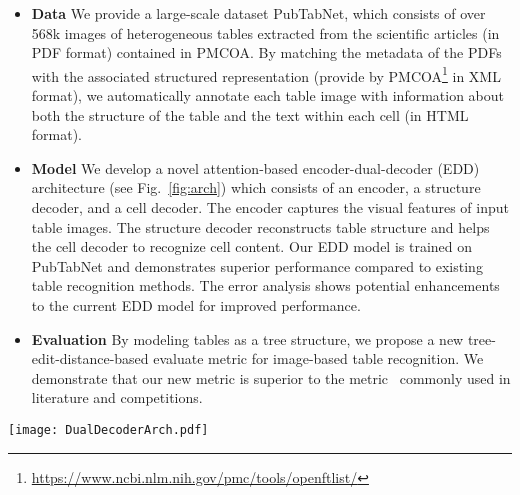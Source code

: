 \documentclass[conference]{IEEEtran}
\begin{document}
\begin{itemize}[noitemsep,leftmargin=*]
  \item \textbf{Data} We provide a large-scale dataset PubTabNet, which
  consists of over 568k images of heterogeneous tables extracted from the
  scientific articles (in PDF format) contained in PMCOA. By matching the metadata
  of the PDFs with the associated structured representation (provide by PMCOA\footnote{\url{https://www.ncbi.nlm.nih.gov/pmc/tools/openftlist/}} in
  XML format), we automatically annotate each table image with information about
  both the structure of the table and the text within each cell (in HTML format).
  \item \textbf{Model} We develop a novel attention-based encoder-dual-decoder (EDD)
  architecture (see Fig.~\ref{fig:arch}) which consists of an encoder, a
  structure decoder, and a cell decoder. The encoder captures the visual features
  of input table images. The structure decoder reconstructs table
  structure and helps the cell decoder to recognize cell content. Our EDD model is
  trained on PubTabNet and demonstrates superior performance compared to existing
  table recognition methods. The error analysis shows potential enhancements to
  the current EDD model for improved performance.
  \item \textbf{Evaluation} By modeling tables as a tree structure, we propose a
  new tree-edit-distance-based evaluate metric for image-based table
  recognition. We demonstrate that our new metric is superior to the
  metric~\cite{hurst2003constraint} commonly used in literature and
  competitions.
\end{itemize}

\begin{figure*}[!ht]
\begin{center}
  \texttt{[image: DualDecoderArch.pdf]}
\end{center}
  \caption{EDD architecture. The encoder is a convolutional neural network which
  captures the visual features of the input table image.  and 
  are attention network for the structure decoder and cell decoder,
  respectively.  and  are recurrent units for the structure decoder
  and cell decoder, respectively. The structure decoder reconstructs table
  structure and helps the cell decoder to generate cell content. The output of
  the structure decoder and the cell decoder is merged to obtain the HTML
  representation of the input table image.}
\label{fig:arch}
\end{figure*}
\end{document}
